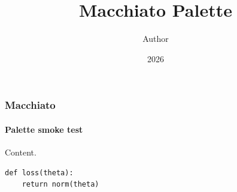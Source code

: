 \documentclass[notheorems,aspectratio=169]{beamer}
\title{Macchiato Palette}
\author{Author}
\date{2026}
\begin{document}
\maketitle

\begin{frame}[fragile]
  \frametitle{Macchiato}
  \framesubtitle{Palette smoke test}

  Content.

  \begin{verbatim}
def loss(theta):
    return norm(theta)
  \end{verbatim}
\end{frame}
\end{document}
